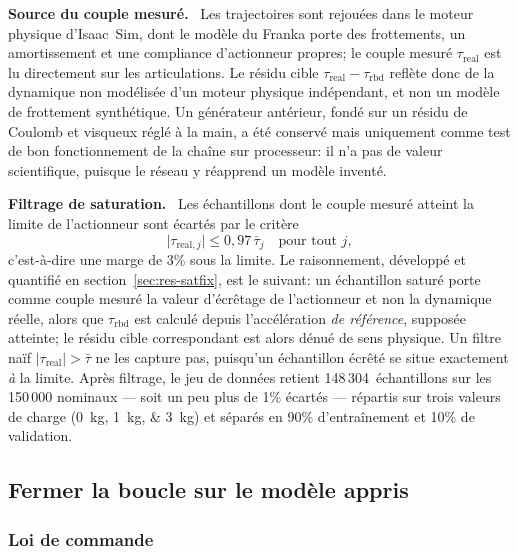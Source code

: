 \documentclass[a4paper, oneside]{article}
\newcommand{\parag}[1]{%
    \par\medskip\noindent\textbf{#1}\ \ignorespaces%
}
\newcommand{\taurbd}{\ensuremath{\tau_{\mathrm{rbd}}}}
\newcommand{\taureal}{\ensuremath{\tau_{\mathrm{real}}}}
\begin{document}
\parag{Source du couple mesuré.} Les trajectoires sont rejouées dans le
moteur physique d'Isaac~Sim, dont le modèle du Franka porte des frottements, un
amortissement et une compliance d'actionneur propres; le couple mesuré
$\taureal$ est lu directement sur les articulations. Le résidu cible
$\taureal - \taurbd$ reflète donc de la dynamique non modélisée d'un moteur
physique indépendant, et non un modèle de frottement synthétique. Un générateur
antérieur, fondé sur un résidu de Coulomb et visqueux réglé à la main, a été
conservé mais uniquement comme test de bon fonctionnement de la chaîne sur
processeur: il n'a pas de valeur scientifique, puisque le réseau y réapprend un
modèle inventé.

\parag{Filtrage de saturation.} Les échantillons dont le couple mesuré
atteint la limite de l'actionneur sont écartés par le critère
%
\begin{equation}
    \bigl|\tau_{\mathrm{real},j}\bigr| \le 0{,}97\,\bar{\tau}_j
    \quad \text{pour tout } j ,
    \label{eq:satfilter}
\end{equation}
%
c'est-à-dire une marge de 3\% sous la limite. Le raisonnement, développé et
quantifié en section~\ref{sec:res-satfix}, est le suivant: un échantillon saturé
porte comme couple mesuré la valeur d'écrêtage de l'actionneur et non la
dynamique réelle, alors que $\taurbd$ est calculé depuis l'accélération \emph{de
référence}, supposée atteinte; le résidu cible correspondant est alors dénué de
sens physique. Un filtre naïf $|\taureal| > \bar{\tau}$ ne les capture pas,
puisqu'un échantillon écrêté se situe exactement \emph{à} la limite. Après
filtrage, le jeu de données retient 148\,304~échantillons sur les 150\,000
nominaux — soit un peu plus de 1\% écartés — répartis sur trois valeurs de
charge (\SIlist{0;1;3}{kg}) et séparés en 90\% d'entraînement et 10\% de validation.

\subsection{Fermer la boucle sur le modèle appris}
\label{sec:boucle}

\subsubsection{Loi de commande}
\end{document}
